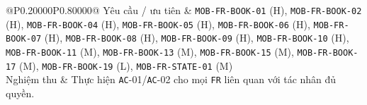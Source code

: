\begin{longtable}{@{}P{0.20000\SRSWidth}P{0.80000\SRSWidth}@{}}
Yêu cầu /\allowbreak{} ưu tiên & \texttt{MOB-\allowbreak{}FR-\allowbreak{}BOOK-\allowbreak{}01} (H), \texttt{MOB-\allowbreak{}FR-\allowbreak{}BOOK-\allowbreak{}02} (H), \texttt{MOB-\allowbreak{}FR-\allowbreak{}BOOK-\allowbreak{}04} (H), \texttt{MOB-\allowbreak{}FR-\allowbreak{}BOOK-\allowbreak{}05} (H), \texttt{MOB-\allowbreak{}FR-\allowbreak{}BOOK-\allowbreak{}06} (H), \texttt{MOB-\allowbreak{}FR-\allowbreak{}BOOK-\allowbreak{}07} (H), \texttt{MOB-\allowbreak{}FR-\allowbreak{}BOOK-\allowbreak{}08} (H), \texttt{MOB-\allowbreak{}FR-\allowbreak{}BOOK-\allowbreak{}09} (H), \texttt{MOB-\allowbreak{}FR-\allowbreak{}BOOK-\allowbreak{}10} (H), \texttt{MOB-\allowbreak{}FR-\allowbreak{}BOOK-\allowbreak{}11} (M), \texttt{MOB-\allowbreak{}FR-\allowbreak{}BOOK-\allowbreak{}13} (M), \texttt{MOB-\allowbreak{}FR-\allowbreak{}BOOK-\allowbreak{}15} (M), \texttt{MOB-\allowbreak{}FR-\allowbreak{}BOOK-\allowbreak{}17} (M), \texttt{MOB-\allowbreak{}FR-\allowbreak{}BOOK-\allowbreak{}19} (L), \texttt{MOB-\allowbreak{}FR-\allowbreak{}STATE-\allowbreak{}01} (M) \\[3pt]
Nghiệm thu & Thực hiện \texttt{AC}-01/\allowbreak{}\texttt{AC}-02 cho mọi \texttt{FR} liên quan với tác nhân đủ quyền. \\[3pt]
\end{longtable}
\endgroup

